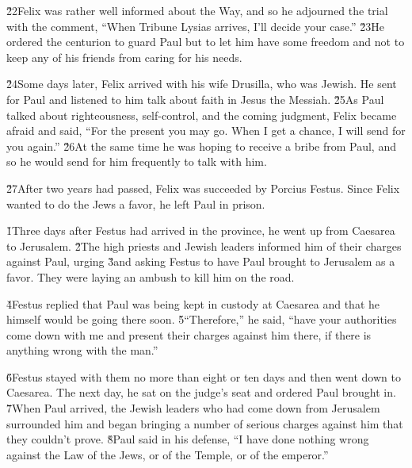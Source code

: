 \v{22}Felix was rather well informed about the Way, and so he adjourned the trial with the comment, ``When Tribune Lysias arrives, I'll decide your case.'' \v{23}He ordered the centurion to guard Paul but to let him have some freedom and not to keep any of his friends from caring for his needs.

\v{24}Some days later, Felix arrived with his wife Drusilla, who was Jewish. He sent for Paul and listened to him talk about faith in Jesus the Messiah. \v{25}As Paul talked about righteousness, self-control, and the coming judgment, Felix became afraid and said, ``For the present you may go. When I get a chance, I will send for you again.'' \v{26}At the same time he was hoping to receive a bribe from Paul, and so he would send for him frequently to talk with him.

\v{27}After two years had passed, Felix was succeeded by Porcius Festus. Since Felix wanted to do the Jews a favor, he left Paul in prison.

\v{1}Three days after Festus had arrived in the province, he went up from Caesarea to Jerusalem. \v{2}The high priests and Jewish leaders informed him of their charges against Paul, urging \v{3}and asking Festus to have Paul brought to Jerusalem as a favor. They were laying an ambush to kill him on the road.

\v{4}Festus replied that Paul was being kept in custody at Caesarea and that he himself would be going there soon. \v{5}``Therefore,'' he said, ``have your authorities come down with me and present their charges against him there, if there is anything wrong with the man.''

\v{6}Festus stayed with them no more than eight or ten days and then went down to Caesarea. The next day, he sat on the judge's seat and ordered Paul brought in. \v{7}When Paul arrived, the Jewish leaders who had come down from Jerusalem surrounded him and began bringing a number of serious charges against him that they couldn't prove. \v{8}Paul said in his defense, ``I have done nothing wrong against the Law of the Jews, or of the Temple, or of the emperor.''

